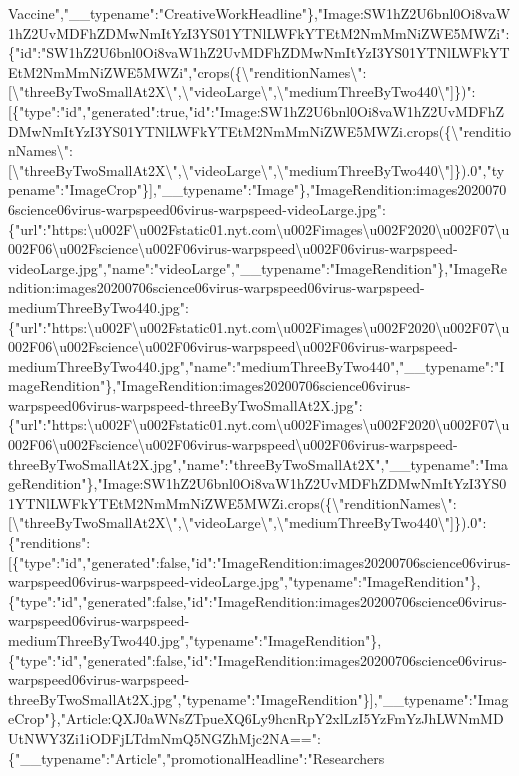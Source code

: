Vaccine","\_\_typename":"CreativeWorkHeadline"\},"Image:SW1hZ2U6bnl0Oi8vaW1hZ2UvMDFhZDMwNmItYzI3YS01YTNlLWFkYTEtM2NmMmNiZWE5MWZi":\{"id":"SW1hZ2U6bnl0Oi8vaW1hZ2UvMDFhZDMwNmItYzI3YS01YTNlLWFkYTEtM2NmMmNiZWE5MWZi","crops(\{\textbackslash{}"renditionNames\textbackslash{}":{[}\textbackslash{}"threeByTwoSmallAt2X\textbackslash{}",\textbackslash{}"videoLarge\textbackslash{}",\textbackslash{}"mediumThreeByTwo440\textbackslash{}"{]}\})":{[}\{"type":"id","generated":true,"id":"Image:SW1hZ2U6bnl0Oi8vaW1hZ2UvMDFhZDMwNmItYzI3YS01YTNlLWFkYTEtM2NmMmNiZWE5MWZi.crops(\{\textbackslash{}"renditionNames\textbackslash{}":{[}\textbackslash{}"threeByTwoSmallAt2X\textbackslash{}",\textbackslash{}"videoLarge\textbackslash{}",\textbackslash{}"mediumThreeByTwo440\textbackslash{}"{]}\}).0","typename":"ImageCrop"\}{]},"\_\_typename":"Image"\},"ImageRendition:images20200706science06virus-warpspeed06virus-warpspeed-videoLarge.jpg":\{"url":"https:\textbackslash{}u002F\textbackslash{}u002Fstatic01.nyt.com\textbackslash{}u002Fimages\textbackslash{}u002F2020\textbackslash{}u002F07\textbackslash{}u002F06\textbackslash{}u002Fscience\textbackslash{}u002F06virus-warpspeed\textbackslash{}u002F06virus-warpspeed-videoLarge.jpg","name":"videoLarge","\_\_typename":"ImageRendition"\},"ImageRendition:images20200706science06virus-warpspeed06virus-warpspeed-mediumThreeByTwo440.jpg":\{"url":"https:\textbackslash{}u002F\textbackslash{}u002Fstatic01.nyt.com\textbackslash{}u002Fimages\textbackslash{}u002F2020\textbackslash{}u002F07\textbackslash{}u002F06\textbackslash{}u002Fscience\textbackslash{}u002F06virus-warpspeed\textbackslash{}u002F06virus-warpspeed-mediumThreeByTwo440.jpg","name":"mediumThreeByTwo440","\_\_typename":"ImageRendition"\},"ImageRendition:images20200706science06virus-warpspeed06virus-warpspeed-threeByTwoSmallAt2X.jpg":\{"url":"https:\textbackslash{}u002F\textbackslash{}u002Fstatic01.nyt.com\textbackslash{}u002Fimages\textbackslash{}u002F2020\textbackslash{}u002F07\textbackslash{}u002F06\textbackslash{}u002Fscience\textbackslash{}u002F06virus-warpspeed\textbackslash{}u002F06virus-warpspeed-threeByTwoSmallAt2X.jpg","name":"threeByTwoSmallAt2X","\_\_typename":"ImageRendition"\},"Image:SW1hZ2U6bnl0Oi8vaW1hZ2UvMDFhZDMwNmItYzI3YS01YTNlLWFkYTEtM2NmMmNiZWE5MWZi.crops(\{\textbackslash{}"renditionNames\textbackslash{}":{[}\textbackslash{}"threeByTwoSmallAt2X\textbackslash{}",\textbackslash{}"videoLarge\textbackslash{}",\textbackslash{}"mediumThreeByTwo440\textbackslash{}"{]}\}).0":\{"renditions":{[}\{"type":"id","generated":false,"id":"ImageRendition:images20200706science06virus-warpspeed06virus-warpspeed-videoLarge.jpg","typename":"ImageRendition"\},\{"type":"id","generated":false,"id":"ImageRendition:images20200706science06virus-warpspeed06virus-warpspeed-mediumThreeByTwo440.jpg","typename":"ImageRendition"\},\{"type":"id","generated":false,"id":"ImageRendition:images20200706science06virus-warpspeed06virus-warpspeed-threeByTwoSmallAt2X.jpg","typename":"ImageRendition"\}{]},"\_\_typename":"ImageCrop"\},"Article:QXJ0aWNsZTpueXQ6Ly9hcnRpY2xlLzI5YzFmYzJhLWNmMDUtNWY3Zi1iODFjLTdmNmQ5NGZhMjc2NA==":\{"\_\_typename":"Article","promotionalHeadline":"Researchers
